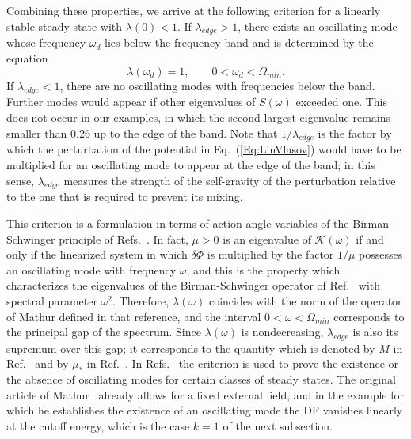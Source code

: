 Combining these properties, we arrive at the following criterion for a linearly stable steady state with $\lambda(0) < 1$. If $\lambda_{edge} > 1$, there exists an oscillating mode whose frequency $\omega_d$ lies below the frequency band and is determined by the equation
\begin{equation}
\lambda(\omega_d) = 1,\qquad 0 < \omega_d < \Omega_{min}.
\label{Eq:ModeFrequency}
\end{equation}
If $\lambda_{edge} < 1$, there are no oscillating modes with frequencies below the band. Further modes would appear if other eigenvalues of $S(\omega)$ exceeded one. This does not occur in our examples, in which the second largest eigenvalue remains smaller than $0.26$ up to the edge of the band. Note that $1/\lambda_{edge}$ is the factor by which the perturbation of the potential in Eq.~(\ref{Eq:LinVlasov}) would have to be multiplied for an oscillating mode to appear at the edge of the band; in this sense, $\lambda_{edge}$ measures the strength of the self-gravity of the perturbation relative to the one that is required to prevent its mixing.

This criterion is a formulation in terms of action-angle variables of the Birman-Schwinger principle of Refs.~\cite{sM90,mHgRcS22,Kunze-Book,mK22,mHgRmScS25}. In fact, $\mu > 0$ is an eigenvalue of $\mathcal{K}(\omega)$ if and only if the linearized system in which $\delta\Phi$ is multiplied by the factor $1/\mu$ possesses an oscillating mode with frequency $\omega$, and this is the property which characterizes the eigenvalues of the Birman-Schwinger operator of Ref.~\cite{mHgRmScS25} with spectral parameter $\omega^2$. Therefore, $\lambda(\omega)$ coincides with the norm of the operator of Mathur defined in that reference, and the interval $0 < \omega < \Omega_{min}$ corresponds to the principal gap of the spectrum. Since $\lambda(\omega)$ is nondecreasing, $\lambda_{edge}$ is also its supremum over this gap; it corresponds to the quantity which is denoted by $M$ in Ref.~\cite{mHgRcS22} and by $\mu_*$ in Ref.~\cite{mK22}. In Refs.~\cite{mHgRcS22,Kunze-Book,mHgRmScS25} the criterion is used to prove the existence or the absence of oscillating modes for certain classes of steady states. The original article of Mathur~\cite{sM90} already allows for a fixed external field, and in the example for which he establishes the existence of an oscillating mode the DF vanishes linearly at the cutoff energy, which is the case $k = 1$ of the next subsection. 

